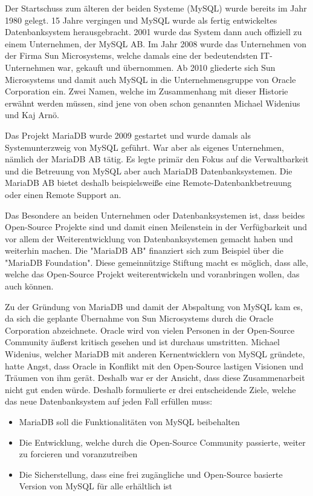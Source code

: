 
Der Startschuss zum älteren der beiden Systeme (MySQL) wurde bereits im Jahr 1980 gelegt. 15 Jahre vergingen und MySQL wurde als fertig entwickeltes Datenbanksystem herausgebracht. 2001 wurde das System dann auch offiziell zu einem Unternehmen, der MySQL AB. Im Jahr 2008 wurde das Unternehmen von der Firma Sun Microsystems, welche damals eine der bedeutendsten IT-Unternehmen war, gekauft und übernommen. Ab 2010 gliederte sich Sun Microsystems und damit auch MySQL in die Unternehmensgruppe von Oracle Corporation ein. Zwei Namen, welche im Zusammenhang mit dieser Historie erwähnt werden müssen, sind jene von oben schon genannten Michael Widenius und Kaj Arnö. \cite{MariaMy}

Das Projekt MariaDB wurde 2009 gestartet und wurde damals als Systemunterzweig von MySQL geführt. War aber als eigenes Unternehmen, nämlich der MariaDB AB tätig. Es legte primär den Fokus auf die Verwaltbarkeit und die Betreuung von MySQL aber auch MariaDB Datenbanksystemen. Die MariaDB AB bietet deshalb beispielsweiße eine Remote-Datenbankbetreuung oder einen Remote Support an. \cite{MariaMy}

Das Besondere an beiden Unternehmen oder Datenbanksystemen ist, dass beides Open-Source Projekte sind und damit einen Meilenstein in der Verfügbarkeit und vor allem der Weiterentwicklung von Datenbanksystemen gemacht haben und weiterhin machen. Die "MariaDB AB" finanziert sich zum Beispiel über die "MariaDB Foundation". Diese gemeinnützige Stiftung macht es möglich, dass alle, welche das Open-Source Projekt weiterentwickeln und voranbringen wollen, das auch können. \cite{MariaMy}

Zu der Gründung von MariaDB und damit der Abspaltung von MySQL kam es, da sich die geplante Übernahme von Sun Microsystems durch die Oracle Corporation abzeichnete. Oracle wird von vielen Personen in der Open-Source Community äußerst kritisch gesehen und ist durchaus umstritten. Michael Widenius, welcher MariaDB mit anderen Kernentwicklern von MySQL gründete, hatte Angst, dass Oracle in Konflikt mit den Open-Source lastigen Visionen und Träumen von ihm gerät. Deshalb war er der Ansicht, dass diese Zusammenarbeit nicht gut enden würde. Deshalb formulierte er drei entscheidende Ziele, welche das neue Datenbanksystem auf jeden Fall erfüllen muss: \cite{MariaMy}

\begin{itemize}
    \item MariaDB soll die Funktionalitäten von MySQL beibehalten
    \item Die Entwicklung, welche durch die Open-Source Community passierte, weiter zu forcieren und voranzutreiben
    \item Die Sicherstellung, dass eine frei zugängliche und Open-Source basierte Version von MySQL für alle erhältlich ist
\end{itemize}

\cite{MariaMy}